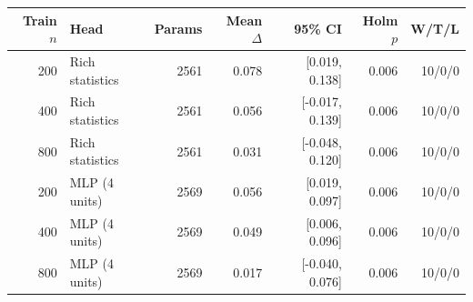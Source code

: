 \begin{tabular}{rlrrrrr}
\toprule
Train $n$ & Head & Params & Mean $\Delta$ & 95\% CI & Holm $p$ & W/T/L \\
\midrule
200 & Rich statistics & 2561 & 0.078 & [0.019, 0.138] & 0.006 & 10/0/0 \\
400 & Rich statistics & 2561 & 0.056 & [-0.017, 0.139] & 0.006 & 10/0/0 \\
800 & Rich statistics & 2561 & 0.031 & [-0.048, 0.120] & 0.006 & 10/0/0 \\
200 & MLP (4 units) & 2569 & 0.056 & [0.019, 0.097] & 0.006 & 10/0/0 \\
400 & MLP (4 units) & 2569 & 0.049 & [0.006, 0.096] & 0.006 & 10/0/0 \\
800 & MLP (4 units) & 2569 & 0.017 & [-0.040, 0.076] & 0.006 & 10/0/0 \\
\bottomrule
\end{tabular}
